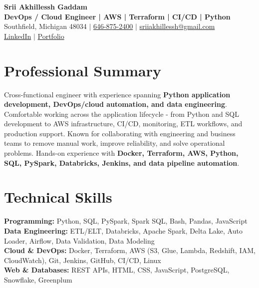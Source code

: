 \documentclass[letterpaper,10pt]{article}
\begin{document}
\fontsize{9.35pt}{10.45pt}\selectfont

\begin{center}
    {\LARGE \textbf{Srii Akhillessh Gaddam}} \\[-1pt]
    \textbf{DevOps / Cloud Engineer | AWS | Terraform | CI/CD | Python} \\[2pt]
    Southfield, Michigan 48034 $|$
    \href{tel:6468752400}{646-875-2400} $|$
    \href{mailto:sriiakhillessh@gmail.com}{sriiakhillessh@gmail.com} \\[1pt]
    \href{https://www.linkedin.com/in/srii-akhiilessh-gaddam-b48668191/}{LinkedIn} $|$
    \href{https://sriiakhillesshg.github.io/portfolio/}{Portfolio}
\end{center}
\vspace{-8pt}

\section{Professional Summary}
\small{Cross-functional engineer with experience spanning \textbf{Python application development, DevOps/cloud automation, and data engineering}. Comfortable working across the application lifecycle - from Python and SQL development to AWS infrastructure, CI/CD, monitoring, ETL workflows, and production support. Known for collaborating with engineering and business teams to remove manual work, improve reliability, and solve operational problems. Hands-on experience with \textbf{Docker, Terraform, AWS, Python, SQL, PySpark, Databricks, Jenkins, and data pipeline automation}.}

\section{Technical Skills}
\small{
\textbf{Programming:} Python, SQL, PySpark, Spark SQL, Bash, Pandas, JavaScript \\
\textbf{Data Engineering:} ETL/ELT, Databricks, Apache Spark, Delta Lake, Auto Loader, Airflow, Data Validation, Data Modeling \\
\textbf{Cloud \& DevOps:} Docker, Terraform, AWS (S3, Glue, Lambda, Redshift, IAM, CloudWatch), Git, Jenkins, GitHub, CI/CD, Linux \\
\textbf{Web \& Databases:} REST APIs, HTML, CSS, JavaScript, PostgreSQL, Snowflake, Greenplum
}
\end{document}
